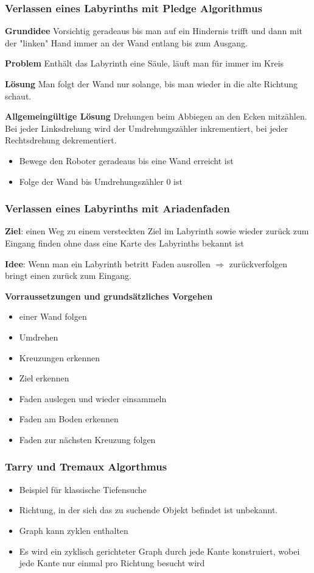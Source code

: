 \subsubsection{Verlassen eines Labyrinths mit Pledge Algorithmus}
\textbf{Grundidee} Vorsichtig geradeaus bis man auf ein Hindernis trifft und
dann mit der "linken" Hand immer an der Wand entlang bis zum Ausgang.

\textbf{Problem} Enthält das Labyrinth eine Säule, läuft man für immer im
Kreis

\textbf{Lösung} Man folgt der Wand nur solange, bis man wieder in die alte
Richtung schaut.

\textbf{Allgemeingültige Lösung} Drehungen beim Abbiegen an den Ecken
mitzählen. Bei jeder Linksdrehung wird der Umdrehungszähler inkrementiert, bei
jeder Rechtsdrehung dekrementiert.
\begin{itemize}
	\item Bewege den Roboter geradeaus bis eine Wand erreicht ist
	\item Folge der Wand bis Umdrehungszähler 0 ist
\end{itemize}

\subsubsection{Verlassen eines Labyrinths mit Ariadenfaden}
\textbf{Ziel}: einen Weg zu einem versteckten Ziel im Labyrinth sowie wieder
zurück zum Eingang finden ohne dass eine Karte des Labyrinths bekannt ist

\textbf{Idee}: Wenn man ein Labyrinth betritt Faden ausrollen $\Rightarrow$
zurückverfolgen bringt einen zurück zum Eingang.

\textbf{Vorraussetzungen und grundsätzliches Vorgehen}
\begin{itemize}
	\item einer Wand folgen
	\item Umdrehen
	\item Kreuzungen erkennen
	\item Ziel erkennen
	\item Faden auslegen und wieder einsammeln
	\item Faden am Boden erkennen
	\item Faden zur nächsten Kreuzung folgen
\end{itemize}

\subsubsection{Tarry und Tremaux Algorthmus}
\begin{itemize}
	\item Beispiel für klassische Tiefensuche
	\item Richtung, in der sich das zu suchende Objekt befindet ist unbekannt.
	\item Graph kann zyklen enthalten
	\item Es wird ein zyklisch gerichteter Graph durch jede Kante konstruiert,
		wobei jede Kante nur einmal pro Richtung besucht wird
\end{itemize}

